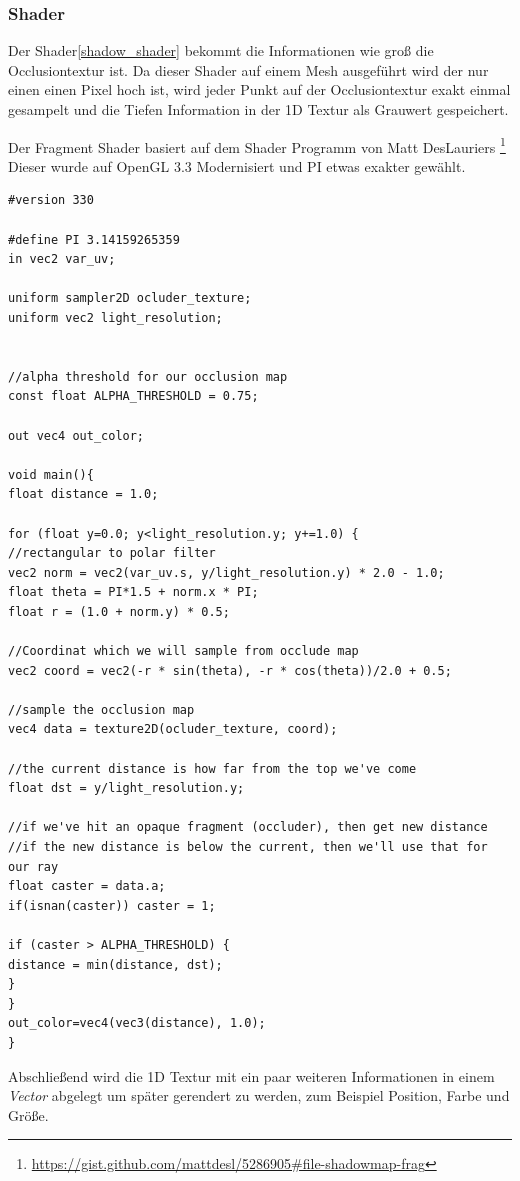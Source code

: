 \subsubsection{Shader}
Der Shader\ref{shadow_shader} bekommt die Informationen wie groß die Occlusiontextur ist.
Da dieser Shader auf einem Mesh ausgeführt wird der nur einen einen Pixel hoch ist, wird jeder Punkt auf der Occlusiontextur exakt einmal gesampelt und die Tiefen Information in der 1D Textur als Grauwert gespeichert.

Der Fragment Shader basiert auf dem Shader Programm von Matt DesLauriers \footnote{\url{https://gist.github.com/mattdesl/5286905\#file-shadowmap-frag}}
Dieser wurde auf OpenGL 3.3 Modernisiert und PI etwas exakter gewählt.
\begin{lstlisting}[caption=Shadowmaper Shader,label=shadow_shader]
#version 330

#define PI 3.14159265359
in vec2 var_uv;

uniform sampler2D ocluder_texture;
uniform vec2 light_resolution;


//alpha threshold for our occlusion map
const float ALPHA_THRESHOLD = 0.75;

out vec4 out_color;

void main(){
float distance = 1.0;

for (float y=0.0; y<light_resolution.y; y+=1.0) {
//rectangular to polar filter
vec2 norm = vec2(var_uv.s, y/light_resolution.y) * 2.0 - 1.0;
float theta = PI*1.5 + norm.x * PI;
float r = (1.0 + norm.y) * 0.5;

//Coordinat which we will sample from occlude map
vec2 coord = vec2(-r * sin(theta), -r * cos(theta))/2.0 + 0.5;

//sample the occlusion map
vec4 data = texture2D(ocluder_texture, coord);

//the current distance is how far from the top we've come
float dst = y/light_resolution.y;

//if we've hit an opaque fragment (occluder), then get new distance
//if the new distance is below the current, then we'll use that for our ray
float caster = data.a;
if(isnan(caster)) caster = 1;

if (caster > ALPHA_THRESHOLD) {
distance = min(distance, dst);
}
}
out_color=vec4(vec3(distance), 1.0);
}
\end{lstlisting}

Abschließend wird die 1D Textur mit ein paar weiteren Informationen in einem \textit{Vector} abgelegt um später gerendert zu werden, zum Beispiel Position, Farbe und Größe.

